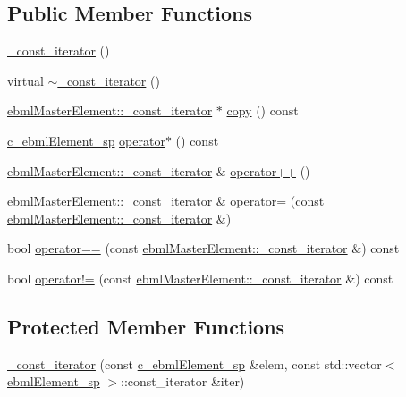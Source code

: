 \subsection*{Public Member Functions}
\begin{DoxyCompactItemize}
\item 
\mbox{\hyperlink{classebml_1_1ebmlList_1_1__const__iterator_a2e4df37bf8485e7517498683f5ab5ca6}{\+\_\+const\+\_\+iterator}} ()
\item 
virtual \mbox{\hyperlink{classebml_1_1ebmlList_1_1__const__iterator_ad0a42056feeeb952125dcedd4eecb2a6}{$\sim$\+\_\+const\+\_\+iterator}} ()
\item 
\mbox{\hyperlink{classebml_1_1ebmlMasterElement_1_1__const__iterator}{ebml\+Master\+Element\+::\+\_\+const\+\_\+iterator}} $\ast$ \mbox{\hyperlink{classebml_1_1ebmlList_1_1__const__iterator_aae11488b46714c745cdd81d3fb75f57a}{copy}} () const
\item 
\mbox{\hyperlink{namespaceebml_a2deef4e8071531b32e3533f1bf978917}{c\+\_\+ebml\+Element\+\_\+sp}} \mbox{\hyperlink{classebml_1_1ebmlList_1_1__const__iterator_abc0aa1dd7a1d159c1a6f8c77e2736b80}{operator$\ast$}} () const
\item 
\mbox{\hyperlink{classebml_1_1ebmlMasterElement_1_1__const__iterator}{ebml\+Master\+Element\+::\+\_\+const\+\_\+iterator}} \& \mbox{\hyperlink{classebml_1_1ebmlList_1_1__const__iterator_a20f27b727326834e8b2a1c1dd66ffbce}{operator++}} ()
\item 
\mbox{\hyperlink{classebml_1_1ebmlMasterElement_1_1__const__iterator}{ebml\+Master\+Element\+::\+\_\+const\+\_\+iterator}} \& \mbox{\hyperlink{classebml_1_1ebmlList_1_1__const__iterator_a10b96fa207ad1c24cb2374c1ee417646}{operator=}} (const \mbox{\hyperlink{classebml_1_1ebmlMasterElement_1_1__const__iterator}{ebml\+Master\+Element\+::\+\_\+const\+\_\+iterator}} \&)
\item 
bool \mbox{\hyperlink{classebml_1_1ebmlList_1_1__const__iterator_af5249ca7b9ac67296b1e92ffa804bce5}{operator==}} (const \mbox{\hyperlink{classebml_1_1ebmlMasterElement_1_1__const__iterator}{ebml\+Master\+Element\+::\+\_\+const\+\_\+iterator}} \&) const
\item 
bool \mbox{\hyperlink{classebml_1_1ebmlList_1_1__const__iterator_a21d545577f7b61b40ce961d5c9a83cce}{operator!=}} (const \mbox{\hyperlink{classebml_1_1ebmlMasterElement_1_1__const__iterator}{ebml\+Master\+Element\+::\+\_\+const\+\_\+iterator}} \&) const
\end{DoxyCompactItemize}
\subsection*{Protected Member Functions}
\begin{DoxyCompactItemize}
\item 
\mbox{\hyperlink{classebml_1_1ebmlList_1_1__const__iterator_aae58bee847fdcb8173e9b1eb220c7609}{\+\_\+const\+\_\+iterator}} (const \mbox{\hyperlink{namespaceebml_a2deef4e8071531b32e3533f1bf978917}{c\+\_\+ebml\+Element\+\_\+sp}} \&elem, const std\+::vector$<$ \mbox{\hyperlink{namespaceebml_adad533b7705a16bb360fe56380c5e7be}{ebml\+Element\+\_\+sp}} $>$\+::const\+\_\+iterator \&iter)
\end{DoxyCompactItemize}
